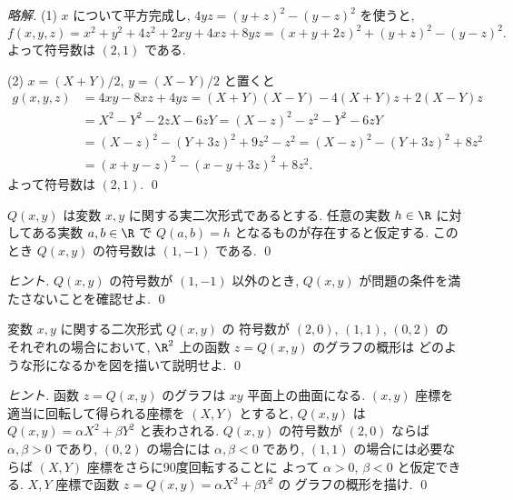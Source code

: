 \documentclass[12pt,twoside]{jarticle}
\newcommand\commentout[1]{#1}
\newcommand\commentout[1]{}
\begin{document}
\commentout{
\begin{proof}[略解]
(1) $x$ について平方完成し, $4yz = (y+z)^2 - (y-z)^2$ を使うと,
\begin{equation*}
  f(x,y,z) 
  = x^2 + y^2 + 4z^2 + 2xy + 4xz + 8yz
  = (x+y+2z)^2 + (y+z)^2 - (y-z)^2.
\end{equation*}
よって符号数は $(2,1)$ である.

\bigskip

\noindent
(2) $x=(X+Y)/2$, $y=(X-Y)/2$ と置くと
\begin{align*}
  g(x,y,z) 
  &
  = 4xy - 8xz + 4yz 
  = (X+Y)(X-Y)  - 4(X+Y)z + 2(X-Y)z
  \\ &
  = X^2 - Y^2 - 2zX - 6zY
  = (X - z)^2 - z^2 - Y^2 - 6zY
  \\ &
  = (X - z)^2 - (Y + 3z)^2 + 9z^2 - z^2
  = (X - z)^2 - (Y + 3z)^2 + 8z^2
  \\ &
  = (x + y - z)^2 - (x - y + 3z)^2 + 8z^2.
\end{align*}
よって符号数は $(2,1)$.
\qed
\end{proof}
}

\begin{question}[5点]
  $Q(x,y)$ は変数 $x,y$ に関する実二次形式であるとする.
  任意の実数 $h\in\R$ に対してある実数 $a,b\in\R$ 
  で $Q(a,b)=h$ となるものが存在すると仮定する.
  このとき $Q(x,y)$ の符号数は $(1,-1)$ である.
  \qed
\end{question}

\begin{proof}[ヒント]
  $Q(x,y)$ の符号数が $(1,-1)$ 以外のとき, %
  $Q(x,y)$ が問題の条件を満たさないことを確認せよ.
  \qed
\end{proof}

\begin{question}[10点]
  変数 $x,y$ に関する二次形式 $Q(x,y)$ の
  符号数が $(2,0)$, $(1,1)$, $(0,2)$ の
  それぞれの場合において, $\R^2$ 上の函数 $z=Q(x,y)$ のグラフの概形は
  どのような形になるかを図を描いて説明せよ.
  \qed
\end{question}

\begin{proof}[ヒント]
  函数 $z=Q(x,y)$ のグラフは $xy$ 平面上の曲面になる.
  $(x,y)$ 座標を適当に回転して得られる座標を $(X,Y)$ とすると, %
  $Q(x,y)$ は $Q(x,y)=\alpha X^2 + \beta Y^2$ と表わされる.
  $Q(x,y)$ の符号数が $(2,0)$ ならば $\alpha,\beta>0$ であり, %
  $(0,2)$ の場合には $\alpha,\beta<0$ であり, %
  $(1,1)$ の場合には必要ならば $(X,Y)$ 座標をさらに90度回転することに
  よって $\alpha>0$, $\beta<0$ と仮定できる. 
  $X,Y$ 座標で函数 $z=Q(x,y)=\alpha X^2+\beta Y^2$ の
  グラフの概形を描け.
  \qed
\end{proof}
\end{document}
